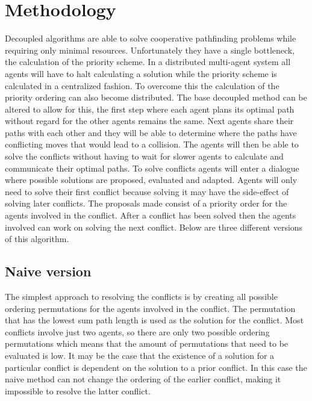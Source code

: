 \section{Methodology}\label{sec:method}
Decoupled algorithms are able to solve cooperative pathfinding problems while
requiring only minimal resources. Unfortunately they have a single bottleneck,
the calculation of the priority scheme. In a distributed multi-agent system all
agents will have to halt calculating a solution while the priority scheme is
calculated in a centralized fashion. To overcome this the calculation of the
priority ordering can also become distributed. The base decoupled method can be
altered to allow for this, the first step where each agent plans its optimal
path without regard for the other agents remains the same. Next agents share
their paths with each other and they will be able to determine where the paths
have conflicting moves that would lead to a collision. The agents will then be
able to solve the conflicts without having to wait for slower agents to
calculate and communicate their optimal paths. To solve conflicts agents will
enter a dialogue where possible solutions are proposed, evaluated and adapted.
Agents will only need to solve their first conflict because solving it may have
the side-effect of solving later conflicts. The proposals made consist of a
priority order for the agents involved in the conflict. After a conflict has
been solved then the agents involved can work on solving the next conflict.
Below are three different versions of this algorithm.

\subsection{Naive version}
The simplest approach to resolving the conflicts is by creating all possible
ordering permutations for the agents involved in the conflict. The permutation
that has the lowest sum path length is used as the solution for the conflict.
Most conflicts involve just two agents, so there are only two possible ordering
permutations which means that the amount of permutations that need to be
evaluated is low. It may be the case that the existence of a solution for a
particular conflict is dependent on the solution to a prior conflict. In this
case the naive method can not change the ordering of the earlier conflict,
making it impossible to resolve the latter conflict.


